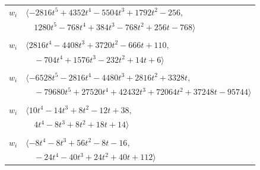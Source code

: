 \documentclass[11pt]{article}
\begin{document}
\begin{longtable}{@{}ll@{}}
$w_i$ & $\langle -2816t^{5}+4352t^{4}-5504t^{3}+1792t^{2}-256,$\\
 & $\quad 1280t^{5}-768t^{4}+384t^{3}-768t^{2}+256t-768\rangle$\\
\addlinespace[2pt]
\multicolumn{2}{@{}p{0.97\textwidth}@{}}{$i=55$, $D_i=4$, $\rho_{ij}$: $3{:}1, \allowbreak 5{:}1, \allowbreak 7{:}3, \allowbreak 8{:}3, \allowbreak 37{:}1, \allowbreak 38{:}3, \allowbreak 40{:}2, \allowbreak 42{:}2, \allowbreak 45{:}3, \allowbreak 51{:}3, \allowbreak 52{:}3, \allowbreak 65{:}3$}\\
$w_i$ & $\langle 2816t^{4}-4408t^{3}+3720t^{2}-666t+110,$\\
 & $\quad -704t^{4}+1576t^{3}-232t^{2}+14t+6\rangle$\\
\addlinespace[2pt]
\multicolumn{2}{@{}p{0.97\textwidth}@{}}{$i=56$, $D_i=4$, $e_i=1$, $\rho_{ij}$: $1{:}2, \allowbreak 5{:}2, \allowbreak 7{:}1, \allowbreak 9{:}1, \allowbreak 11{:}1, \allowbreak 13{:}1, \allowbreak 21{:}1, \allowbreak 25{:}3, \allowbreak 37{:}2, \allowbreak 44{:}3, \allowbreak 58{:}2, \allowbreak 59{:}3, \allowbreak 60{:}3, \allowbreak 63{:}3, \allowbreak 66{:}1, \allowbreak 76{:}1, \allowbreak 77{:}1$}\\
$w_i$ & $\langle -6528t^{5}-2816t^{4}-4480t^{3}+2816t^{2}+3328t,$\\
 & $\quad -79680t^{5}+27520t^{4}+42432t^{3}+72064t^{2}+37248t-95744\rangle$\\
\addlinespace[2pt]
\multicolumn{2}{@{}p{0.97\textwidth}@{}}{$i=57$, $D_i=1$, $\rho_{ij}$: $11{:}3, \allowbreak 13{:}3, \allowbreak 17{:}1, \allowbreak 20{:}3, \allowbreak 35{:}2, \allowbreak 36{:}1, \allowbreak 48{:}1, \allowbreak 50{:}1, \allowbreak 51{:}2, \allowbreak 53{:}1, \allowbreak 68{:}3, \allowbreak 74{:}1$}\\
$w_i$ & $\langle 10t^{4}-14t^{3}+8t^{2}-12t+38,$\\
 & $\quad 4t^{4}-8t^{3}+8t^{2}+18t+14\rangle$\\
\addlinespace[2pt]
\multicolumn{2}{@{}p{0.97\textwidth}@{}}{$i=58$, $D_i=1$, $\rho_{ij}$: $3{:}1, \allowbreak 5{:}2, \allowbreak 32{:}1, \allowbreak 33{:}1, \allowbreak 35{:}1, \allowbreak 36{:}1, \allowbreak 44{:}2, \allowbreak 46{:}3, \allowbreak 48{:}1, \allowbreak 49{:}3, \allowbreak 54{:}1, \allowbreak 56{:}2, \allowbreak 70{:}2, \allowbreak 72{:}3, \allowbreak 74{:}3, \allowbreak 77{:}2$}\\
$w_i$ & $\langle -8t^{4}-8t^{3}+56t^{2}-8t-16,$\\
 & $\quad -24t^{4}-40t^{3}+24t^{2}+40t+112\rangle$\\

\end{longtable}
\end{document}
